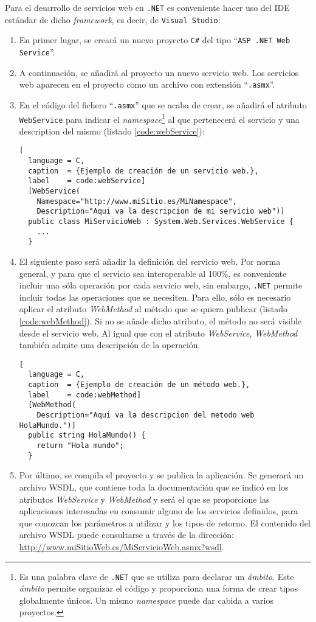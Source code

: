 Para el desarrollo de servicios web en \texttt{.NET} es conveniente hacer uso
del \acs{IDE} estándar de dicho \emph{framework}, es decir, de \texttt{Visual
Studio}:
\begin{enumerate}
\item En primer lugar, se creará un nuevo proyecto \texttt{C\#} del tipo
``\texttt{ASP .NET Web Service}''.
\item A continuación, se añadirá al proyecto un nuevo servicio web. Los
servicios web aparecen en el proyecto como un archivo con extensión
``\texttt{.asmx}''.
\item En el código del fichero ``\texttt{.asmx}'' que se acaba de crear, se
añadirá el atributo \texttt{WebService} para indicar el
\emph{namespace}\footnote{Es una palabra clave de \texttt{.NET} que se utiliza
para declarar un \emph{ámbito}. Este \emph{ámbito} permite organizar el código
y proporciona una forma de crear tipos globalmente únicos. Un mismo
\emph{namespace} puede dar cabida a varios proyectos.} al que pertenecerá el
servicio y una description del mismo (listado \ref{code:webService}):

\begin{lstlisting}[
  language = C,
  caption  = {Ejemplo de creación de un servicio web.},
  label    = code:webService]
  [WebService(
    Namespace="http://www.miSitio.es/MiNamespace",
    Description="Aqui va la descripcion de mi servicio web")]
  public class MiServicioWeb : System.Web.Services.WebService {
    ...
  }
\end{lstlisting}

\item El siguiente paso será añadir la definición del servicio web. Por norma
general, y para que el servicio sea interoperable al 100\%, es conveniente
incluir una sóla operación por cada servicio web, sin embargo, \texttt{.NET}
permite incluir todas las operaciones que se necesiten. Para ello, sólo es
necesario aplicar el atributo \emph{WebMethod} al método que se quiera publicar
(listado \ref{code:webMethod}). Si no se añade dicho atributo, el método no
será visible desde el servicio web. Al igual que con el atributo
\emph{WebService}, \emph{WebMethod} también admite una descripción de la
operación.

\begin{lstlisting}[
  language = C,
  caption  = {Ejemplo de creación de un método web.},
  label    = code:webMethod]
  [WebMethod(
    Description="Aqui va la descripcion del metodo web HolaMundo.")]
  public string HolaMundo() {
    return "Hola mundo";
  }
\end{lstlisting}

\item Por último, se compila el proyecto y se publica la aplicación. Se
generará un archivo \acs{WSDL}, que contiene toda la documentación que se
indicó en los atributos \emph{WebService} y \emph{WebMethod} y será el que se 
proporcione las aplicaciones interesadas en consumir alguno de los servicios
definidos, para que conozcan los parámetros a utilizar y los tipos de retorno.
El contenido del archivo \acs{WSDL} puede consultarse a través de la dirección:
\url{http://www.miSitioWeb.es/MiServicioWeb.asmx?wsdl}.
\end{enumerate}

